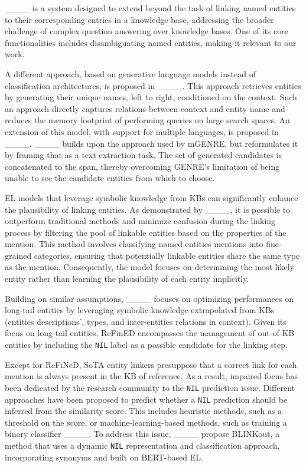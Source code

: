 ____ is a system designed to extend beyond the task of linking named entities to their corresponding entries in a knowledge base, addressing the broader challenge of complex question answering over knowledge bases. One of its core functionalities includes disambiguating named entities, making it relevant to our work.

A different approach, based on generative language models instead of classification architectures, is proposed in ____.
This approach retrieves entities by generating their unique names, left to right, conditioned on the context.
Such an approach directly captures relations between context and entity name and reduces the memory footprint of performing queries on large search spaces.
An extension of this model, with support for multiple languages, is proposed in ____. 
____ builds upon the approach used by mGENRE, but reformulates it by framing that as a text extraction task.
The set of generated candidates is concatenated to the span, thereby overcoming GENRE's limitation of being unable to see the candidate entities from which to choose.

EL models that leverage symbolic knowledge from KBs can significantly enhance the plausibility of linking entities.
As demonstrated by ____, it is possible to outperform traditional methods and minimize confusion during the linking process by filtering the pool of linkable entities based on the properties of the mention.
This method involves classifying named entities mentions into fine-grained categories, ensuring that potentially linkable entities share the same type as the mention.
Consequently, the model focuses on determining the most likely entity rather than learning the plausibility of each entity implicitly.

Building on similar assumptions, ____ focuses on optimizing performances on long-tail entities by leveraging symbolic knowledge extrapolated from KBs (entities descriptions', types, and inter-entities relations in context). Given its focus on long-tail entities, ReFinED encompasses the management of out-of-KB entities by including the \texttt{NIL} label as a possible candidate for the linking step.

Except for ReFiNeD, SoTA entity linkers presuppose that a correct link for each mention is always present in the KB of reference.
As a result, impaired focus has been dedicated by the research community to the \texttt{NIL} prediction issue.
Different approaches have been proposed to predict whether a \texttt{NIL} prediction should be inferred from the similarity score.
This includes heuristic methods, such as a threshold on the score, or machine-learning-based methods, such as training a binary classifier ____. To address this issue, ____ propose BLINKout, a method that uses a dynamic \texttt{NIL} representation and classification approach, incorporating synonyms and built on BERT-based EL.
 
